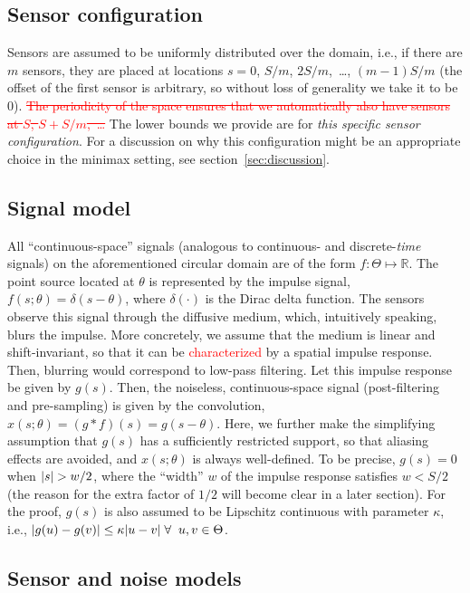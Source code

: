 \documentclass[conference,letterpaper]{IEEEtran}
\DeclarePairedDelimiter\abs{\lvert}{\rvert}
\begin{document}
\subsection{Sensor configuration}

Sensors are assumed to be uniformly distributed over the domain, i.e., if there
are $m$ sensors, they are placed at locations $s = 0$, $S/m$, $2S/m$,~\dots,
$(m{-}1)S/m$ (the offset of the first sensor is arbitrary, so without loss of
generality we take it to be 0). \textcolor{red}{\sout{The periodicity of the space ensures that we
automatically also have sensors at $S$, $S{+}S/m$,~\dots\@}} The lower bounds we
provide are for \emph{this specific sensor configuration}. For a discussion on
why this configuration might be an appropriate choice in the minimax setting,
see section~\ref{sec:discussion}.

\subsection{Signal model}
\label{sec:signal-model}

All ``continuous-space'' signals (analogous to continuous- and
discrete-\emph{time} signals) on the aforementioned circular domain are of the
form $f:\Theta\mapsto\mathbb{R}$.  The point source located at $\theta$ is
represented by the impulse signal, $f(s;\theta) = \delta(s - \theta)$, where
$\delta(\cdot)$ is the Dirac delta function.  The sensors observe this signal
through the diffusive medium, which, intuitively speaking, blurs the impulse.
More concretely, we assume that the medium is linear and shift-invariant, so
that it can be \textcolor{red}{characterized} by a spatial impulse response.
Then, blurring would correspond to low-pass filtering.  Let this impulse
response be given by $g(s)$. Then, the noiseless, continuous-space signal
(post-filtering and pre-sampling) is given by the convolution, $x(s; \theta) =
(g*f)(s) = g(s - \theta)$. Here, we further make the simplifying assumption
that $g(s)$ has a sufficiently restricted support, so that aliasing effects are
avoided, and $x(s; \theta)$ is always well-defined. To be precise, $g(s) = 0$
when $\abs{s} > w/2$, where the ``width'' $w$ of the impulse response satisfies
$w < S / 2$ (the reason for the extra factor of $1/2$ will become clear in a
later section). For the proof, $g(s)$ is also assumed to be Lipschitz
continuous with parameter $\kappa$, i.e., $\abs{g(u) - g(v)} \leq \kappa \abs{u
- v} \; \forall \;\; u, v \in \Theta$.

\subsection{Sensor and noise models}
\label{sec:sensor-model}
\end{document}
